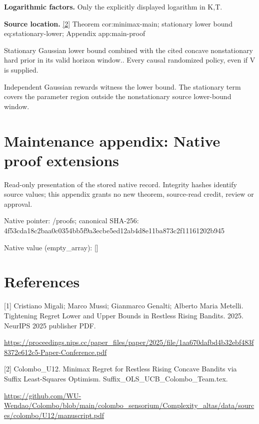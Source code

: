 \documentclass[10pt,a4paper]{article}
\begin{document}
\textbf{Logarithmic factors.} Only the explicitly displayed logarithm in K,T.



\textbf{Source location.} \href{https://github.com/WU-Wendao/Colombo/blob/main/colombo_sensorium/Complexity_altas/data/sources/colombo/U12/manuscript.pdf}{[2]} Theorem cor:minimax-main; stationary lower bound eq:stationary-lower; Appendix app:main-proof



Stationary Gaussian lower bound combined with the cited concave nonstationary hard prior in its valid horizon window.. Every causal randomized policy, even if V is supplied.



Independent Gaussian rewards witness the lower bound. The stationary term covers the parameter region outside the nonstationary source lower-bound window.



\section{Maintenance appendix: Native proof extensions}


Read-only presentation of the stored native record. Integrity hashes identify source values; this appendix grants no new theorem, source-read credit, review or approval.



Native pointer: /proofs; canonical SHA-256: 4f53cda18c2baa0c0354bb5f\allowbreak{}9a3ecbe5ed12ab4d8e11ba87\allowbreak{}3c2f11161202b945



Native value (empty\_array): []



\section{References}


[1] Cristiano Migali; Marco Mussi; Gianmarco Genalti; Alberto Maria Metelli. Tightening Regret Lower and Upper Bounds in Restless Rising Bandits. 2025. NeurIPS 2025 publisher PDF.



\url{https://proceedings.nips.cc/paper_files/paper/2025/file/1aa670dafbd4b32ebf483f8372e612c5-Paper-Conference.pdf}



[2] Colombo\_U12. Minimax Regret for Restless Rising Concave Bandits via Suffix Least-Squares Optimism. Suffix\_OLS\_UCB\_Colombo\_Team.tex.



\url{https://github.com/WU-Wendao/Colombo/blob/main/colombo_sensorium/Complexity_altas/data/sources/colombo/U12/manuscript.pdf}
\end{document}
